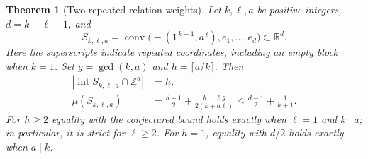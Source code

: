 \documentclass[11pt,a4paper]{article}
\newtheorem{theorem}{Theorem}[section]
\theoremstyle{remark}\newtheorem{remark}[theorem]{Remark}
\begin{document}
\begin{theorem}[Two repeated relation weights]\label{cr6d:family}
Let $k,\ell,a$ be positive integers, $d=k+\ell-1$, and
\[
 S_{k,\ell,a}=
 \operatorname{conv}\bigl(-(1^{\,k-1},a^{\,\ell}),
                         e_1,\ldots,e_d\bigr)
 \subset\mathbb R^d .
\]
Here the superscripts indicate repeated coordinates, including
an empty block when $k=1$.  Set $g=\gcd(k,a)$ and
$h=\lceil a/k\rceil$.  Then
\begin{align}
 |\operatorname{int}S_{k,\ell,a}\cap\mathbb Z^d|&=h,
 \label{cr6d:count}\\
 \mu(S_{k,\ell,a})&=
 \frac{d-1}{2}+\frac{k+\ell g}{2(k+a\ell)}
 \le\frac{d-1}{2}+\frac1{h+1}.
 \label{cr6d:familybound}
\end{align}
For $h\ge2$ equality with the conjectured bound holds exactly
when $\ell=1$ and $k\mid a$; in particular, it is strict for
$\ell\ge2$.  For $h=1$, equality with $d/2$ holds exactly when
$a\mid k$.
\end{theorem}
\end{document}
